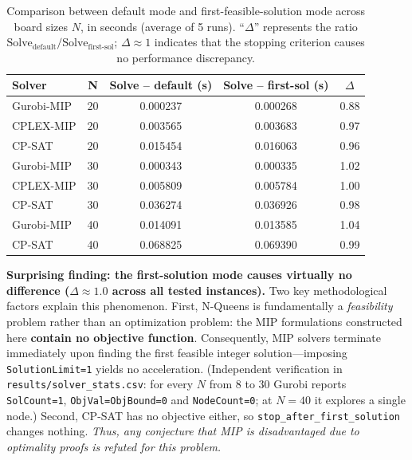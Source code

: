 \documentclass[a4paper,fleqn]{cas-sc}
\begin{document}
\begin{table}[htbp]
    \centering
    \renewcommand{\arraystretch}{1.10}
    \caption{Comparison between default mode and first-feasible-solution mode across board sizes $N$, in seconds (average of 5 runs). ``$\Delta$'' represents the ratio $\text{Solve}_{\text{default}}/\text{Solve}_{\text{first-sol}}$; $\Delta \approx 1$ indicates that the stopping criterion causes no performance discrepancy.}
    \label{tab:fairness}
    \begin{tabular}{l S[table-format=2.0] S[table-format=1.6] S[table-format=1.6] S[table-format=1.2]}
        \toprule
        \textbf{Solver} & \textbf{N} & \textbf{Solve -- default (s)} & \textbf{Solve -- first-sol (s)} & \textbf{$\Delta$} \\
        \midrule
        Gurobi-MIP & 20 & 0.000237 & 0.000268 & 0.88 \\
        CPLEX-MIP  & 20 & 0.003565 & 0.003683 & 0.97 \\
        CP-SAT     & 20 & 0.015454 & 0.016063 & 0.96 \\
        \midrule
        Gurobi-MIP & 30 & 0.000343 & 0.000335 & 1.02 \\
        CPLEX-MIP  & 30 & 0.005809 & 0.005784 & 1.00 \\
        CP-SAT     & 30 & 0.036274 & 0.036926 & 0.98 \\
        \midrule
        Gurobi-MIP & 40 & 0.014091 & 0.013585 & 1.04 \\
        CP-SAT     & 40 & 0.068825 & 0.069390 & 0.99 \\
        \bottomrule
    \end{tabular}
\end{table}

\textbf{Surprising finding: the first-solution mode causes virtually no difference ($\Delta \approx 1.0$ across all tested instances).} Two key methodological factors explain this phenomenon. First, N-Queens is fundamentally a \emph{feasibility} problem rather than an optimization problem: the MIP formulations constructed here \textbf{contain no objective function}. Consequently, MIP solvers terminate immediately upon finding the first feasible integer solution---imposing \texttt{SolutionLimit=1} yields no acceleration. (Independent verification in \texttt{results/solver\_stats.csv}: for every $N$ from $8$ to $30$ Gurobi reports \texttt{SolCount=1}, \texttt{ObjVal=ObjBound=0} and \texttt{NodeCount=0}; at $N=40$ it explores a single node.) Second, CP-SAT has no objective either, so \texttt{stop\_after\_first\_solution} changes nothing. \emph{Thus, any conjecture that MIP is disadvantaged due to optimality proofs is refuted for this problem.}
\end{document}
